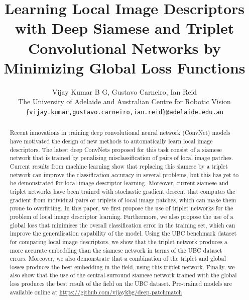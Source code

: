 \documentclass[10pt,twocolumn,letterpaper]{article}
\begin{document}
\title{Learning Local Image Descriptors with Deep Siamese and Triplet Convolutional Networks by Minimizing Global Loss Functions}

\author{Vijay Kumar B G, Gustavo Carneiro, Ian Reid\\
The University of Adelaide and Australian Centre for Robotic Vision\\
{\tt\small \{vijay.kumar,gustavo.carneiro,ian.reid\}@adelaide.edu.au}
}

\maketitle

\begin{abstract}

Recent innovations in training deep convolutional neural network (ConvNet) models have motivated the design of new methods to automatically learn local image descriptors.  The latest deep ConvNets proposed for this task consist of a siamese network that is trained by penalising misclassification of pairs of local image patches.
Current results from machine learning show that replacing this siamese by a triplet network can improve the classification accuracy in several problems, but this has yet to be demonstrated for local image descriptor learning.   
Moreover, current siamese and triplet networks have been trained with stochastic gradient descent that computes the gradient from individual pairs or triplets of local image patches, which can make them prone to overfitting. 
In this paper, we first propose the use of triplet networks for the problem of local image descriptor learning.  Furthermore, we also propose the use of a global loss that minimises the overall classification error in the training set, which can improve the generalisation capability of the model.
Using the UBC benchmark dataset for comparing local image descriptors, we show that the triplet network produces a more accurate embedding than the siamese network in terms of the UBC dataset errors.  Moreover, we also demonstrate that a combination of the triplet and global losses produces the best embedding in the field, using this triplet network.  Finally, we also show that the use of the central-surround siamese network trained with the global loss produces the best result of the field on the UBC dataset.
Pre-trained models are available online at \url{https://github.com/vijaykbg/deep-patchmatch}
\end{abstract}
\end{document}
